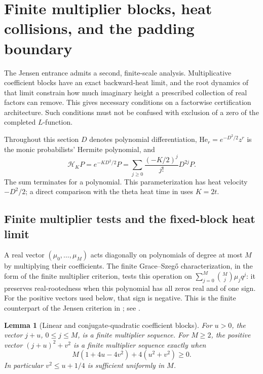 \documentclass[11pt]{article}
\newtheorem{lemma}[theorem]{Lemma}
\theoremstyle{definition}
\theoremstyle{remark}
\begin{document}
\section{Finite multiplier blocks, heat collisions, and the padding boundary}
\label{sec:finite-heat-blocks}

The Jensen entrance admits a second, finite-scale analysis.  Multiplicative
coefficient blocks have an exact backward-heat limit, and the root dynamics
of that limit constrain how much imaginary height a prescribed collection
of real factors can remove.  This gives necessary conditions on a
factorwise certification architecture.  Such conditions must not be
confused with exclusion of a zero of the completed $L$-function.

Throughout this section $D$ denotes polynomial differentiation,
$\mathrm{He}_r=e^{-D^2/2}z^r$ is the monic probabilists' Hermite polynomial,
and
\begin{equation}
 \mathcal H_K P=e^{-KD^2/2}P
 =\sum_{j\ge0}\frac{(-K/2)^j}{j!}D^{2j}P.
 \label{eq:heatblock-operator}
\end{equation}
The sum terminates for a polynomial.  This parameterization has heat
velocity $-D^2/2$; a direct comparison with the theta heat time in
 uses $K=2t$.

\subsection{Finite multiplier tests and the fixed-block heat limit}

A real vector $(\mu_0,\ldots,\mu_M)$ acts diagonally on polynomials of
degree at most $M$ by multiplying their coefficients.  The finite
Grace--Szeg\H{o} characterization, in the form of the finite
multiplier criterion, tests this operation on
$\sum_{j=0}^M\binom Mj\mu_jq^j$: it preserves real-rootedness when this
polynomial has all zeros real and of one sign.  For the positive vectors
used below, that sign is negative.  This is the finite counterpart of
the Jensen criterion in ; see
\cite{CravenCsordasFinite}.

\begin{lemma}[Linear and conjugate-quadratic coefficient blocks]
\label{lem:heatblock-quadratic-test}
For $u>0$, the vector $j+u$, $0\le j\le M$, is a finite multiplier
sequence.  For $M\ge2$, the positive vector $(j+u)^2+v^2$ is a finite
multiplier sequence exactly when
\begin{equation}
 M(1+4u-4v^2)+4(u^2+v^2)\ge0.
 \label{eq:heatblock-quadratic-discriminant}
\end{equation}
In particular $v^2\le u+1/4$ is sufficient uniformly in $M$.
\end{lemma}
\end{document}
